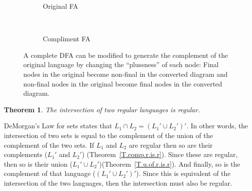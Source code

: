 \documentclass[letterpaper,12pt,openany,reqno]{book}%
\newcommand{\fanonterminalnode}[2] {\node at (#1) (#2) [circle, draw, minimum size=24pt] {#2};}
\newcommand{\faarctransition}[5] {\draw [->] (#1) to[out=#4, in=#5] node  [midway, above] {#3} (#2) ;}
\newtheorem{theorem}{Theorem}
\begin{document}
\begin{figure}[htb]
\centering

\begin{subfigure}[b]{0.45\textwidth}
\centering
{}
\caption{Original FA}
\end{subfigure}
~
\begin{subfigure}[b]{0.45\textwidth}
\centering
{}
\caption{Compliment FA}
\end{subfigure}

 \caption[Complement of a Regular Language]{A complete DFA can be modified to generate the complement of the original language by changing the ``plussness'' of each node: Final nodes in the original become non-final in the converted diagram and non-final nodes in the original become final nodes in the converted diagram.}
  \label{F.RL.Compliment}
\end{figure}

\begin{theorem}
The intersection of two regular languages is regular.
\end{theorem}
DeMorgan's Law for sets states that $L_1 \cap L_2 = (L_1' \cup L_2')'$. In other words, the intersection of two sets is equal to the complement of the union of the complement of the two sets. If $L_1$ and $L_2$ are regular then so are their complements ($L_1'$ and $L_2'$) (Theorem~\ref{T.comp.r.is.r}). Since these are regular, then so is their union ($L_1' \cup L_2'$)(Theorem~\ref{T.u.of.r.is.r}). And finally, so is the complement of that language ($(L_1' \cup L_2')'$). Since this is equivalent of the intersection of the two languages, then the intersection must also be regular.
\end{document}
